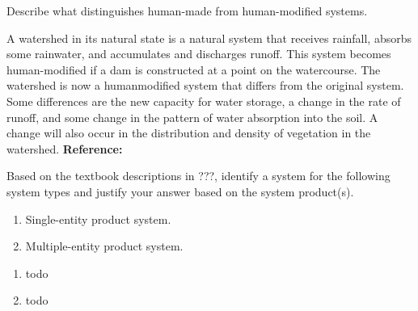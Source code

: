 \begin{exercises}
    \begin{exercise}
    \label{sea-2-3}
        Describe what distinguishes human-made from human-modified systems.
    \end{exercise}
    \begin{solution}
        A watershed in its natural state is a natural system that receives rainfall, absorbs some rainwater, and accumulates and discharges runoff. This system becomes human-modified if a dam is constructed at a point on the watercourse. The watershed is now a humanmodified system that differs from the original system. Some differences are the new capacity for water storage, a change in the rate of runoff, and some change in the pattern of water absorption into the soil. A change will also occur in the distribution and density of vegetation in the watershed. \textbf{Reference:}
    \end{solution}
    
    \begin{exercise}
    \label{sea-2-5_6}
        Based on the textbook descriptions in ???, identify a system for the following system types and justify your answer based on the system product(s).
        \begin{enumerate}[label=\alph*)]
            \item Single-entity product system.
            \item Multiple-entity product system.
        \end{enumerate}
    \end{exercise}
    \begin{solution}
        \begin{enumerate}[label=\alph*)]
            \item todo
            \item todo
        \end{enumerate}
    \end{solution}
    

\end{exercises}
